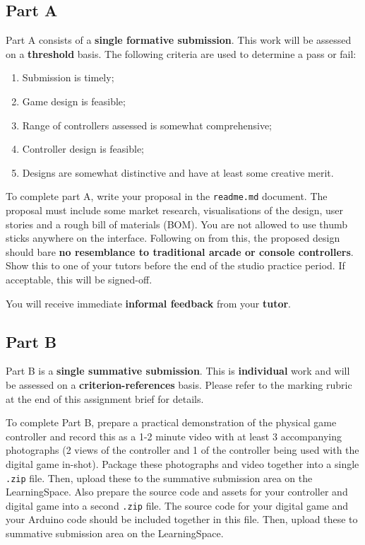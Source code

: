 \documentclass{../../fal_assignment}
\begin{document}
\subsection*{Part A}

Part A consists of a \textbf{single formative submission}. This work will be assessed on a \textbf{threshold} basis. The following criteria are used to determine a pass or fail:

\begin{enumerate}[label=(\alph*)]
	\item Submission is timely;
	\item Game design is feasible;
	\item Range of controllers assessed is somewhat comprehensive;
	\item Controller design is feasible;
	\item Designs are somewhat distinctive and have at least some creative merit.
\end{enumerate}

To complete part A, write your proposal in the \texttt{readme.md} document. The proposal must include some market research, visualisations of the design, user stories and a rough bill of materials (BOM). You are not allowed to use thumb sticks anywhere on the interface. Following on from this, the proposed design should bare \textbf{no resemblance to traditional arcade or console controllers}. Show this to one of your tutors before the end of the studio practice period. If acceptable, this will be signed-off.

You will receive immediate \textbf{informal feedback} from your \textbf{tutor}.

\subsection*{Part B}

Part B is a \textbf{single summative submission}. This is \textbf{individual} work and will be assessed on a \textbf{criterion-references} basis. Please refer to the marking rubric at the end of this assignment brief for details.

To complete Part B, prepare a practical demonstration of the physical game controller and record this as a 1-2 minute video with at least 3 accompanying photographs (2 views of the controller and 1 of the controller being used with the digital game in-shot). Package these photographs and video together into a single \texttt{.zip} file. Then, upload these to the summative submission area on the LearningSpace. Also prepare the source code and assets for your controller and digital game into a second \texttt{.zip} file. The source code for your digital game and your Arduino code should be included together in this file. Then, upload these to summative submission area on the LearningSpace. 
\end{document}
